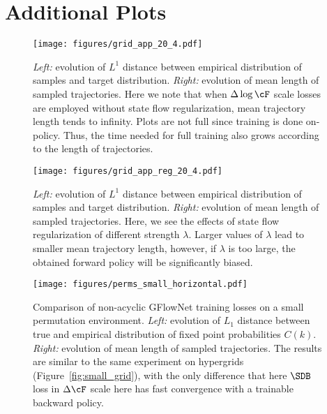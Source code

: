 \newpage

\section{Additional Plots}\label{app:add_plots}

\begin{figure}[h!]
    \centering
    \texttt{[image: figures/grid\_app\_20\_4.pdf]}
    \vspace{-0.15cm}
    \caption{\textit{Left:} evolution of $L^1$ distance between empirical distribution of samples and target distribution. \textit{Right:} evolution of mean length of sampled trajectories. Here we note that when $\Delta \log \cF$ scale losses are employed without state flow regularization, mean trajectory length tends to infinity. Plots are not full since training is done on-policy. Thus, the time needed for full training also grows according to the length of trajectories.} 
\label{fig:big_grid_app}
\end{figure}

\begin{figure}[h!]
    \centering
    \texttt{[image: figures/grid\_app\_reg\_20\_4.pdf]}
    \vspace{-0.15cm}
    \caption{\textit{Left:} evolution of $L^1$ distance between empirical distribution of samples and target distribution. \textit{Right:} evolution of mean length of sampled trajectories. Here, we see the effects of state flow regularization of different strength $\lambda$. Larger values of $\lambda$ lead to smaller mean trajectory length, however, if $\lambda$ is too large, the obtained forward policy will be significantly biased.} 
\label{fig:big_grid_reg_app}
\end{figure}

\begin{figure}[h!]
    \raggedleft
    \texttt{[image: figures/perms\_small\_horizontal.pdf]}
    \vspace{-0.15cm}
    \caption{Comparison of non-acyclic GFlowNet training losses on a small permutation environment. \textit{Left:} evolution of $L_1$ distance between true and empirical distribution of fixed point probabilities $C(k)$. \textit{Right:} evolution of mean length of sampled trajectories. The results are similar to the same experiment on hypergrids (Figure~\ref{fig:small_grid}), with the only difference that here $\SDB$ loss in $\Delta \cF$ scale here has fast convergence with a trainable backward policy.} 
\label{fig:small_perms_app}
\end{figure}
